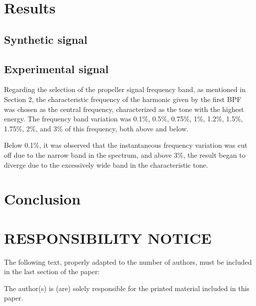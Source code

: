 \documentclass[10pt,fleqn,a4paper,twoside]{article}
\begin{document}
\section{Results}
\subsection{Synthetic signal}
\subsection{Experimental signal}
Regarding the selection of the propeller signal frequency band, as mentioned in Section 2, the characteristic frequency of the harmonic given by the first BPF was chosen as the central frequency, characterized as the tone with the highest energy. The frequency band variation was 0.1\%, 0.5\%, 0.75\%, 1\%, 1.2\%, 1.5\%, 1.75\%, 2\%, and 3\% of this frequency, both above and below.

Below 0.1\%, it was observed that the instantaneous frequency variation was cut off due to the narrow band in the spectrum, and above 3\%, the result began to diverge due to the excessively wide band in the characteristic tone.


\section{Conclusion}



\renewcommand{\refname}{}


\section{RESPONSIBILITY NOTICE}

The following text, properly adapted to the number of authors, must be included in the last section of the paper:

The author(s) is (are) solely responsible for the printed material included in this paper.
\end{document}
